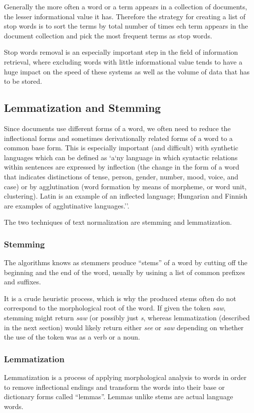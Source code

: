 Generally the more often a word or a term appears in a collection of documents, the lesser informational value it has. Therefore the strategy for creating a list of stop words is to sort the terms by total number of times ech term appears in the document collection and pick the most frequent terms as stop words.\cite{stopwords}

Stop words removal is an especially important step in the field of information retrieval, where excluding words with little informational value tends to have a huge impact on the speed of these systems as well as the volume of data that has to be stored.

\subsection{Lemmatization and Stemming}
Since documents use different forms of a word, we often need to reduce the inflectional forms and sometimes derivationally related forms of a word to a common base form. This is especially important (and difficult) with synthetic languages which can be defined as `a`ny language in which syntactic relations within sentences are expressed by inflection (the change in the form of a word that indicates distinctions of tense, person, gender, number, mood, voice, and case) or by agglutination (word formation by means of morpheme, or word unit, clustering). Latin is an example of an inflected language; Hungarian and Finnish are examples of agglutinative languages.''\cite{synthetic_lang}.

The two techniques of text normalization are stemming and lemmatization.
\subsubsection{Stemming}
The algorithms knows as stemmers produce ``stems'' of a word by cutting off the beginning and the end of the word, usually by usining a list of common prefixes and suffixes.\cite{stemming_vs_lemmatization}

It is a crude heuristic process, which is why the produced stems often do not correspond to the morphological root of the word.  If given the token \textit{saw}, stemming might return \textit{saw} (or possibly just \textit{s}, whereas lemmatization (described in the next section) would likely return either \textit{see} or \textit{saw} depending on whether the use of the token was as a verb or a noun.\cite{stemming_vs_lemmatization_twd}

\subsubsection{Lemmatization}
Lemmatization is a process of applying morphological analysis to words in order to remove inflectional endings and transform the words into their base or dictionary forms called ``lemmas''. Lemmas unlike stems are actual language words.\cite{stopwords} 

